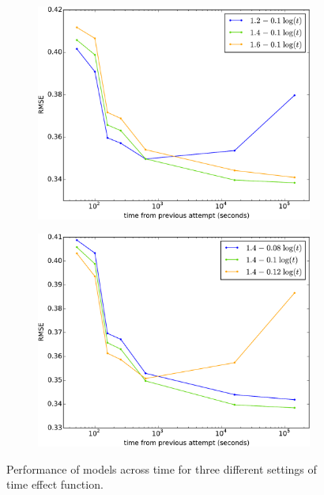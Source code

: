 \begin{figure}[htbp]
  \centering
    \begin{subfigure}{.49\textwidth}
      \centering
      \includegraphics[width=\textwidth]{img/performance-across-time-rmse-parameters-1}
    \end{subfigure}
    \begin{subfigure}{.49\textwidth}
      \centering
      \includegraphics[width=\textwidth]{img/performance-across-time-rmse-parameters-2}
    \end{subfigure}
  \label{fig-performance-across-time}
  \caption{Performance of models across time for three different settings of time effect function.}
\end{figure}

